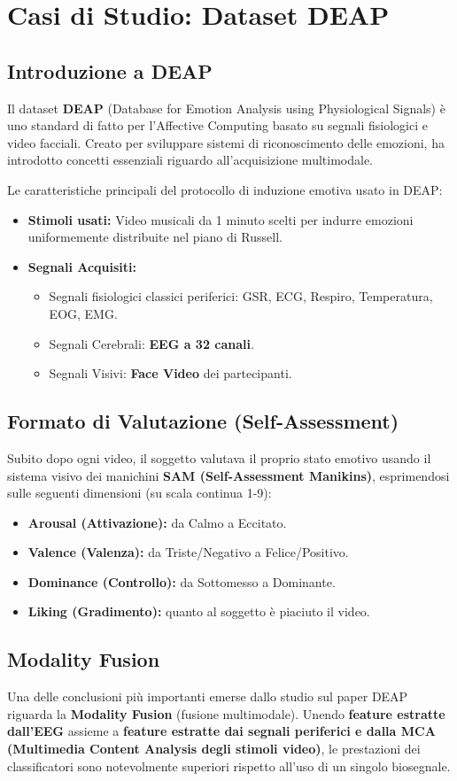 ﻿\chapter{Casi di Studio: Dataset DEAP}

\section{Introduzione a DEAP}
Il dataset \textbf{DEAP} (Database for Emotion Analysis using Physiological Signals) è uno standard di fatto per l'Affective Computing basato su segnali fisiologici e video facciali. Creato per sviluppare sistemi di riconoscimento delle emozioni, ha introdotto concetti essenziali riguardo all'acquisizione multimodale.

Le caratteristiche principali del protocollo di induzione emotiva usato in DEAP:
\begin{itemize}
    \item \textbf{Stimoli usati:} Video musicali da 1 minuto scelti per indurre emozioni uniformemente distribuite nel piano di Russell.
    \item \textbf{Segnali Acquisiti:}
    \begin{itemize}
        \item Segnali fisiologici classici periferici: GSR, ECG, Respiro, Temperatura, EOG, EMG.
        \item Segnali Cerebrali: \textbf{EEG a 32 canali}.
        \item Segnali Visivi: \textbf{Face Video} dei partecipanti.
    \end{itemize}
\end{itemize}

\section{Formato di Valutazione (Self-Assessment)}
Subito dopo ogni video, il soggetto valutava il proprio stato emotivo usando il sistema visivo dei manichini \textbf{SAM (Self-Assessment Manikins)}, esprimendosi sulle seguenti dimensioni (su scala continua 1-9):
\begin{itemize}
    \item \textbf{Arousal (Attivazione):} da Calmo a Eccitato.
    \item \textbf{Valence (Valenza):} da Triste/Negativo a Felice/Positivo.
    \item \textbf{Dominance (Controllo):} da Sottomesso a Dominante.
    \item \textbf{Liking (Gradimento):} quanto al soggetto è piaciuto il video.
\end{itemize}

\section{Modality Fusion}
Una delle conclusioni più importanti emerse dallo studio sul paper DEAP riguarda la \textbf{Modality Fusion} (fusione multimodale). Unendo \textbf{feature estratte dall'EEG} assieme a \textbf{feature estratte dai segnali periferici e dalla MCA (Multimedia Content Analysis degli stimoli video)}, le prestazioni dei classificatori sono notevolmente superiori rispetto all'uso di un singolo biosegnale.

